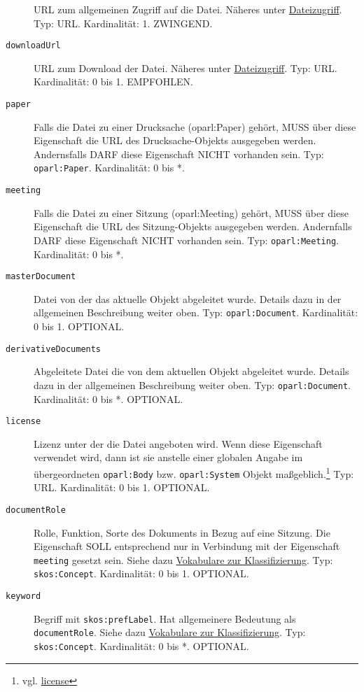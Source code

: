 \documentclass[,a4paper]{article}
\begin{document}
\begin{description}
URL zum allgemeinen Zugriff auf die Datei. Näheres unter
\hyperref[dateizugriff]{Dateizugriff}. Typ: URL. Kardinalität: 1.
ZWINGEND.
\item[\texttt{downloadUrl}]
URL zum Download der Datei. Näheres unter
\hyperref[dateizugriff]{Dateizugriff}. Typ: URL. Kardinalität: 0 bis 1.
EMPFOHLEN.
\item[\texttt{paper}]
Falls die Datei zu einer Drucksache (oparl:Paper) gehört, MUSS über
diese Eigenschaft die URL des Drucksache-Objekts ausgegeben werden.
Andernsfalls DARF diese Eigenschaft NICHT vorhanden sein. Typ:
\texttt{oparl:Paper}. Kardinalität: 0 bis *.
\item[\texttt{meeting}]
Falls die Datei zu einer Sitzung (oparl:Meeting) gehört, MUSS über diese
Eigenschaft die URL des Sitzung-Objekts ausgegeben werden. Andernfalls
DARF diese Eigenschaft NICHT vorhanden sein. Typ:
\texttt{oparl:Meeting}. Kardinalität: 0 bis *.
\item[\texttt{masterDocument}]
Datei von der das aktuelle Objekt abgeleitet wurde. Details dazu in der
allgemeinen Beschreibung weiter oben. Typ: \texttt{oparl:Document}.
Kardinalität: 0 bis 1. OPTIONAL.
\item[\texttt{derivativeDocuments}]
Abgeleitete Datei die von dem aktuellen Objekt abgeleitet wurde. Details
dazu in der allgemeinen Beschreibung weiter oben. Typ:
\texttt{oparl:Document}. Kardinalität: 0 bis *. OPTIONAL.
\item[\texttt{license}]
Lizenz unter der die Datei angeboten wird. Wenn diese Eigenschaft
verwendet wird, dann ist sie anstelle einer globalen Angabe im
übergeordneten \texttt{oparl:Body} bzw. \texttt{oparl:System} Objekt
maßgeblich.\footnote{vgl. \hyperref[eigenschaftux5flicense]{license}}
Typ: URL. Kardinalität: 0 bis 1. OPTIONAL.
\item[\texttt{documentRole}]
Rolle, Funktion, Sorte des Dokuments in Bezug auf eine Sitzung. Die
Eigenschaft SOLL entsprechend nur in Verbindung mit der Eigenschaft
\texttt{meeting} gesetzt sein. Siehe dazu
\hyperref[vokabulareux5fklassifizierung]{Vokabulare zur
Klassifizierung}. Typ: \texttt{skos:Concept}. Kardinalität: 0 bis 1.
OPTIONAL.
\item[\texttt{keyword}]
Begriff mit \texttt{skos:prefLabel}. Hat allgemeinere Bedeutung als
\texttt{documentRole}. Siehe dazu
\hyperref[vokabulareux5fklassifizierung]{Vokabulare zur
Klassifizierung}. Typ: \texttt{skos:Concept}. Kardinalität: 0 bis *.
OPTIONAL.
\end{description}
\end{document}
